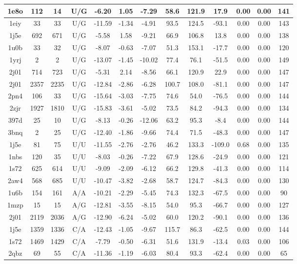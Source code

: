 {\begin{center}
\begin{longtable}{|c|c|c|c|c|c|c|c|c|c|c|c|c|}
1e8o & 112 & 14 & U/G & -6.20 & 1.05 & -7.29 & 58.6 & 121.9 & 17.9 & 0.00 & 0.00 & 141 \\ \hline
1eiy & 33 & 33 & U/G & -11.59 & -1.34 & -4.91 & 93.5 & 124.5 & -93.1 & 0.00 & 0.00 & 143 \\ \hline
1j5e & 692 & 671 & U/G & -5.58 & 1.58 & -9.21 & 66.9 & 106.8 & 13.8 & 0.00 & 0.00 & 138 \\ \hline
1u0b & 33 & 32 & U/G & -8.07 & -0.63 & -7.07 & 51.3 & 153.1 & -17.7 & 0.00 & 0.00 & 120 \\ \hline
1yrj & 2 & 2 & U/G & -13.07 & -1.45 & -10.02 & 77.4 & 76.1 & -51.5 & 0.00 & 0.00 & 149 \\ \hline
2j01 & 714 & 723 & U/G & -5.31 & 2.14 & -8.56 & 66.1 & 120.9 & 22.9 & 0.00 & 0.00 & 147 \\ \hline
2j01 & 2357 & 2235 & U/G & -12.84 & -2.86 & -6.28 & 100.7 & 108.0 & -81.1 & 0.00 & 0.00 & 147 \\ \hline
2pn4 & 106 & 33 & U/G & -15.64 & -3.03 & -7.75 & 74.6 & 54.0 & -76.5 & 0.00 & 0.00 & 144 \\ \hline
2zjr & 1927 & 1810 & U/G & -15.83 & -3.61 & -5.02 & 73.5 & 84.2 & -94.3 & 0.00 & 0.00 & 134 \\ \hline
397d & 25 & 10 & U/G & -8.13 & -0.26 & -12.06 & 63.2 & 95.3 & -8.4 & 0.00 & 0.00 & 144 \\ \hline
3bnq & 2 & 25 & U/G & -12.40 & -1.86 & -9.66 & 74.4 & 71.5 & -48.3 & 0.00 & 0.00 & 147 \\ \hline
1j5e & 81 & 75 & U/U & -11.55 & -2.76 & -2.76 & 46.2 & 133.3 & -109.0 & 0.68 & 0.00 & 135 \\ \hline
1nbs & 120 & 35 & U/U & -8.03 & -0.26 & -7.22 & 67.9 & 128.6 & -24.9 & 0.00 & 0.00 & 121 \\ \hline
1s72 & 625 & 614 & U/U & -9.09 & -2.09 & -6.12 & 66.2 & 129.8 & -41.3 & 0.00 & 0.00 & 114 \\ \hline
2aw4 & 568 & 685 & U/U & -10.47 & -3.82 & -2.68 & 58.7 & 124.7 & -84.3 & 0.00 & 0.00 & 130 \\ \hline
1u6b & 154 & 161 & A/A & -10.21 & -2.29 & -5.45 & 74.3 & 132.3 & -67.5 & 0.00 & 0.00 & 90 \\ \hline
1mzp & 15 & 15 & A/G & -12.81 & -3.55 & -8.15 & 54.0 & 95.3 & -66.7 & 0.00 & 0.00 & 127 \\ \hline
2j01 & 2119 & 2036 & A/G & -12.90 & -6.24 & -5.02 & 60.0 & 120.2 & -90.1 & 0.00 & 0.00 & 136 \\ \hline
1j5e & 1359 & 1336 & C/A & -12.43 & -1.05 & -9.67 & 115.7 & 86.3 & -62.5 & 0.00 & 0.00 & 144 \\ \hline
1s72 & 1469 & 1429 & C/A & -7.79 & -0.50 & -6.31 & 51.6 & 131.9 & -13.4 & 0.03 & 0.00 & 106 \\ \hline
2qbz & 69 & 55 & C/A & -11.36 & -1.19 & -6.03 & 80.4 & 93.3 & -62.4 & 0.00 & 0.00 & 65 \\ \hline
\end{longtable}
\end{center}
}




%
